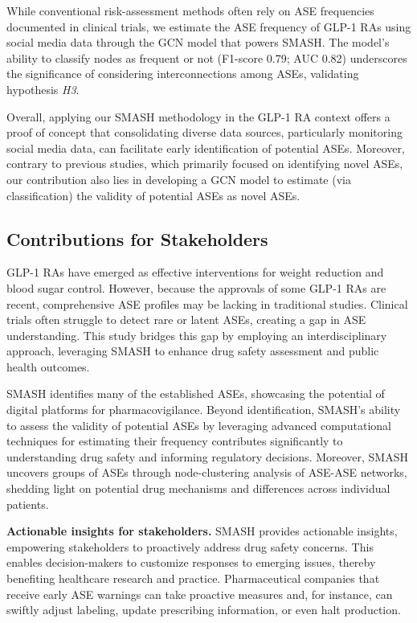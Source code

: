 \documentclass[referee,bst/sn-basic]{sn-jnl}%
\theoremstyle{thmstyletwo}%
\theoremstyle{thmstylethree}%
\begin{document}
While conventional risk-assessment methods often rely on ASE frequencies documented in clinical trials, we estimate the ASE frequency of GLP-1 RAs using social media data through the GCN model that powers SMASH.
The model's ability to classify nodes as frequent or not (F1-score 0.79; AUC 0.82) underscores the significance of considering interconnections among ASEs, validating hypothesis \textit{H3}. 

Overall, applying our SMASH methodology in the GLP-1 RA context offers a proof of concept that consolidating diverse data sources, particularly monitoring social media data, can facilitate early identification of potential ASEs. 
Moreover, contrary to previous studies, which primarily focused on identifying novel ASEs, our contribution also lies in developing a GCN model to estimate (via classification) the validity of potential ASEs as novel ASEs.
\subsection{Contributions for Stakeholders}

GLP-1 RAs have emerged as effective interventions for weight reduction and blood sugar control. 
However, because the approvals of some GLP-1 RAs are recent, comprehensive ASE profiles may be lacking in traditional studies. 
Clinical trials often struggle to detect rare or latent ASEs, creating a gap in ASE understanding. 
This study bridges this gap by employing an interdisciplinary approach, leveraging SMASH to enhance drug safety assessment and public health outcomes.

SMASH identifies many of the established ASEs, showcasing the potential of digital platforms for pharmacovigilance. 
Beyond identification, SMASH's ability to assess the validity of potential ASEs by leveraging advanced computational techniques for estimating their frequency contributes significantly to understanding drug safety and informing regulatory decisions.
Moreover, SMASH uncovers groups of ASEs through node-clustering analysis of ASE-ASE networks, shedding light on potential drug mechanisms and differences across individual patients.

\textbf{Actionable insights for stakeholders.}
SMASH provides actionable insights, empowering stakeholders to proactively address drug safety concerns. 
This enables decision-makers to customize responses to emerging issues, thereby benefiting healthcare research and practice.
Pharmaceutical companies that receive early ASE warnings can take proactive measures and, for instance, can swiftly adjust labeling, update prescribing information, or even halt production.
\end{document}
